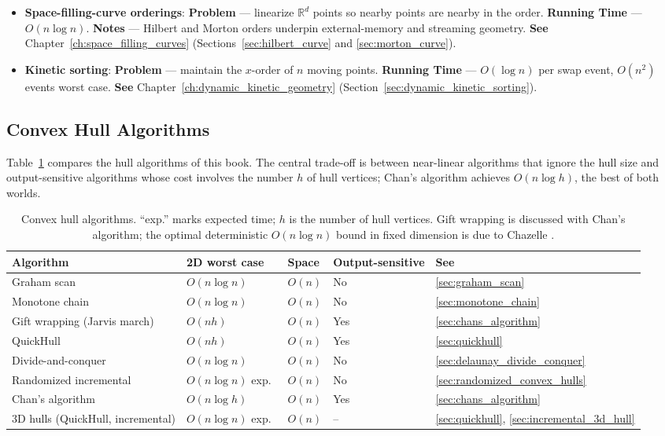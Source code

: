 \begin{itemize}
  \item \textbf{Space-filling-curve orderings}:
    \textbf{Problem} --- linearize $\mathbb{R}^d$ points so nearby points
    are nearby in the order. \textbf{Running Time} --- $O(n\log n)$.
    \textbf{Notes} --- Hilbert and Morton orders underpin external-memory
    and streaming geometry. \textbf{See} Chapter~\ref{ch:space_filling_curves}
    (Sections~\ref{sec:hilbert_curve} and \ref{sec:morton_curve}).
  \item \textbf{Kinetic sorting}:
    \textbf{Problem} --- maintain the $x$-order of $n$ moving points.
    \textbf{Running Time} --- $O(\log n)$ per swap event, $O(n^2)$ events
    worst case. \textbf{See} Chapter~\ref{ch:dynamic_kinetic_geometry}
    (Section~\ref{sec:dynamic_kinetic_sorting}).
\end{itemize}

\subsection{Convex Hull Algorithms}
\label{sec:appalgs_sorting_hulls}

Table~\ref{tbl:appalgs_hull} compares the hull algorithms of this book.
The central trade-off is between near-linear algorithms that ignore the
hull size and output-sensitive algorithms whose cost involves the number
$h$ of hull vertices; Chan's algorithm \cite{chan1996} achieves
$O(n\log h)$, the best of both worlds.

\begin{table}[htbp]
\centering
\begin{tabular}{lllll}
\toprule
Algorithm & 2D worst case & Space & Output-sensitive & See \\
\midrule
Graham scan         & $O(n\log n)$ & $O(n)$ & No  & \ref{sec:graham_scan} \\
Monotone chain      & $O(n\log n)$ & $O(n)$ & No  & \ref{sec:monotone_chain} \\
Gift wrapping (Jarvis march) & $O(nh)$ & $O(n)$ & Yes & \ref{sec:chans_algorithm} \\
QuickHull           & $O(nh)$      & $O(n)$ & Yes & \ref{sec:quickhull} \\
Divide-and-conquer  & $O(n\log n)$ & $O(n)$ & No  & \ref{sec:delaunay_divide_conquer} \\
Randomized incremental & $O(n\log n)$ exp.\ & $O(n)$ & No & \ref{sec:randomized_convex_hulls} \\
Chan's algorithm    & $O(n\log h)$ & $O(n)$ & Yes & \ref{sec:chans_algorithm} \\
3D hulls (QuickHull, incremental) & $O(n\log n)$ exp.\ & $O(n)$ & -- & \ref{sec:quickhull}, \ref{sec:incremental_3d_hull} \\
\bottomrule
\end{tabular}
\caption{Convex hull algorithms. ``exp.'' marks expected time; $h$ is the
number of hull vertices. Gift wrapping is discussed with Chan's algorithm;
the optimal deterministic $O(n\log n)$ bound in fixed dimension is due to
Chazelle \cite{chazelle1993}.}
\label{tbl:appalgs_hull}
\end{table}

